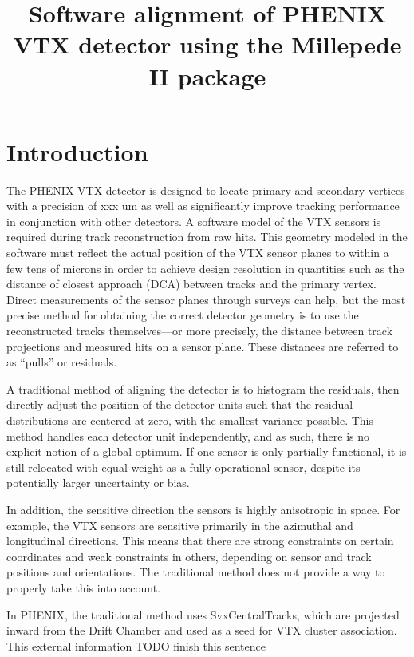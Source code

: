 \documentclass[12pt]{article}
\title{\sffamily\bfseries{Software alignment of PHENIX VTX detector using the Millepede II package}}
\author{\sffamily{Andrew Adare, Darren McGlinchey, Jin Huang, Jamie Nagle}}
\date{\sffamily{\today}}
\begin{document}
\maketitle
\section{Introduction}
The PHENIX VTX detector is designed to locate primary and secondary vertices with a precision of xxx um as well as significantly improve tracking performance in conjunction with other detectors. A software model of the VTX sensors is required during track reconstruction from raw hits. This geometry modeled in the software must reflect the actual position of the VTX sensor planes to within a few tens of microns in order to achieve design resolution in quantities such as the distance of closest approach (DCA) between tracks and the primary vertex. Direct measurements of the sensor planes through surveys can help, but the most precise method for obtaining the correct detector geometry is to use the reconstructed tracks themselves---or more precisely, the distance between track projections and measured hits on a sensor plane. These distances are referred to as ``pulls'' or residuals.

A traditional method of aligning the detector is to histogram the residuals, then directly adjust the position of the detector units such that the residual distributions are centered at zero, with the smallest variance possible. This method handles each detector unit independently, and as such, there is no explicit notion of a global optimum. If one sensor is only partially functional, it is still relocated with equal weight as a fully operational sensor, despite its potentially larger uncertainty or bias. 

In addition, the sensitive direction the sensors is highly anisotropic in space. For example, the VTX sensors are sensitive primarily in the azimuthal and longitudinal directions. This means that there are strong constraints on certain coordinates and weak constraints in others, depending on sensor and track positions and orientations. The traditional method does not provide a way to properly take this into account.

In PHENIX, the traditional method uses SvxCentralTracks, which are projected inward from the Drift Chamber and used as a seed for VTX cluster association. This external information TODO finish this sentence
\end{document}
